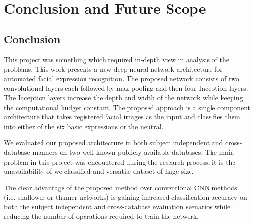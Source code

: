 \chapter{Conclusion and Future Scope}
\section{Conclusion}
This project was something which required in-depth view in analysis of the problems. This work presents a new deep neural network architecture for automated facial expression recognition. The proposed network consists of two convolutional layers each followed by max pooling and then four Inception layers. The Inception layers increase the depth and width of the network while keeping the computational budget constant. The proposed approach is a single component architecture that takes registered facial images as the input and classifies them into either of the six basic expressions or the neutral. 

We evaluated our proposed architecture in both subject independent and cross-database manners on two well-known publicly available databases. The main problem in this project was encountered during the research process, it is the unavailability of we classified and versatile dataset of huge size.

The clear advantage of the proposed method over conventional CNN methods (i.e. shallower or thinner networks) is gaining increased classification accuracy on both the subject independent and cross-database evaluation scenarios while reducing the number of operations required to train the network.

